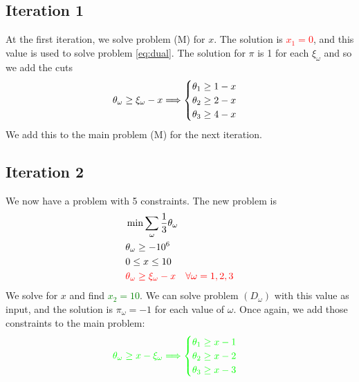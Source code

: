 \documentclass[12pt, openany]{report}
\theoremstyle{definition}
\begin{document}
\subsection{Iteration 1}
At the first iteration, we solve problem (M) for $x$. The solution is \textcolor{red}{$x_1=0$}, and this value is used to solve problem \eqref{eq:dual}. The solution for $\pi$ is 1 for each $\xi_\omega$ and so we add the cuts 
\color{red}
\begin{equation}
	\theta_\omega \ge \xi_\omega -x \Longrightarrow \begin{cases}
		\theta_1 \ge 1-x\\
		\theta_2 \ge 2-x\\
		\theta_3 \ge 4-x\\
	\end{cases}\color{black}
\end{equation}\color{black}
We add this to the main problem (M) for the next iteration.
\subsection{Iteration 2}
We now have a problem with 5 constraints. The new problem is 
\begin{equation}
	\begin{aligned}
		& \min \sum_\omega \frac{1}{3}\theta_\omega \\
		& \theta_\omega \ge -10^{6}\\
		& 0\le x\le 10\\
		& \color{red}\theta_\omega \ge \xi_\omega -x \quad \forall \omega=1,2,3\color{black}
	\end{aligned}
\end{equation}
We solve for $x$ and find \textcolor{green}{$x_2=10$}. We can solve problem $(D_\omega)$ with this value as input, and the solution is $\pi_\omega = -1$ for each value of $\omega$. Once again, we add those constraints to the main problem:
\begin{equation}
	\color{green}
	\theta_\omega \ge x-\xi_\omega \Longrightarrow \begin{cases}
		\theta_1 \ge x-1\\
		\theta_2 \ge x-2\\
		\theta_3 \ge x-3
	\end{cases}\color{black}
\end{equation}
\end{document}
